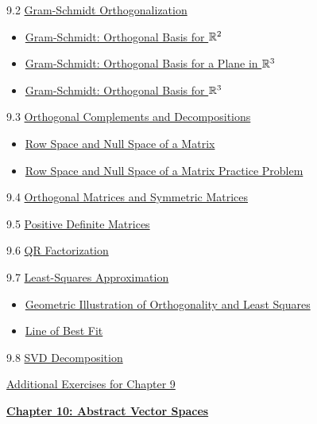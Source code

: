 \documentclass{ximera}
\begin{document}
9.2	\href{https://ximera.osu.edu/oerlinalg/LinearAlgebra/RTH-0015/main}{Gram-Schmidt Orthogonalization}
\begin{itemize}
    \item 
    \href{https://www.geogebra.org/m/xtqppyav}{Gram-Schmidt: Orthogonal Basis for $\mathbb{R}^2$}
    \item
    \href{https://www.geogebra.org/m/zghsfkym}{Gram-Schmidt: Orthogonal Basis for a Plane in $\mathbb{R}^3$}
    \item
    \href{https://www.geogebra.org/m/qjpvmsws}{Gram-Schmidt:  Orthogonal Basis for $\mathbb{R}^3$}
\end{itemize}
	
9.3	\href{https://ximera.osu.edu/oerlinalg/LinearAlgebra/RTH-0020/main}{Orthogonal Complements and Decompositions}
\begin{itemize}
    \item 
    \href{https://www.geogebra.org/m/f6eavqxs}{Row Space and Null Space of a Matrix}
    \item
    \href{https://www.geogebra.org/m/tyntjmdp}{Row Space and Null Space of a Matrix Practice Problem}
\end{itemize}
	
9.4	\href{https://ximera.osu.edu/oerlinalg/LinearAlgebra/RTH-0035/main}{Orthogonal Matrices and Symmetric Matrices}
	
9.5	\href{https://ximera.osu.edu/oerlinalg/LinearAlgebra/RTH-0045/main}{Positive Definite Matrices}
	
9.6	\href{https://ximera.osu.edu/oerlinalg/LinearAlgebra/RTH-0040/main}{QR Factorization}
	
9.7	\href{https://ximera.osu.edu/oerlinalg/LinearAlgebra/RTH-0030/main}{Least-Squares Approximation}
\begin{itemize}
    \item 
    \href{https://www.geogebra.org/classic/mm7wauhw}{Geometric Illustration of Orthogonality and Least Squares}
    \item 
    \href{https://www.geogebra.org/classic/crgw4usb}{Line of Best Fit}
\end{itemize}
	
9.8	\href{https://ximera.osu.edu/oerlinalg/LinearAlgebra/RTH-0060/main}{SVD Decomposition}
	
\href{https://ximera.osu.edu/oerlinalg/LinearAlgebra/SUPX-0090/main}{Additional Exercises for Chapter 9}
	
\href{https://ximera.osu.edu/oerlinalg/LinearAlgebra/XLAChapter_vecSpaces/main}{\textbf{Chapter 10: Abstract Vector Spaces}}
	
\end{document}
